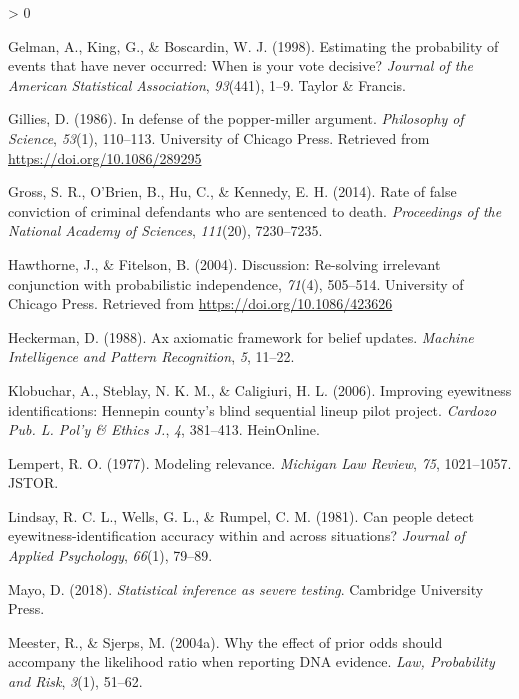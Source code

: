 \documentclass[
  10pt,
  dvipsnames,enabledeprecatedfontcommands]{scrartcl}
\newlength{\cslhangindent}
\newenvironment{CSLReferences}[2] %
 {%
  \setlength{\parindent}{0pt}
  \ifodd #1 \everypar{\setlength{\hangindent}{\cslhangindent}}\ignorespaces\fi
  \ifnum #2 > 0
  \setlength{\parskip}{#2\baselineskip}
  \fi
 }%
 {}
\begin{document}
\begin{CSLReferences}{1}{0}
\leavevmode\hypertarget{ref-gelman1998estimating}{}%
Gelman, A., King, G., \& Boscardin, W. J. (1998). Estimating the
probability of events that have never occurred: When is your vote
decisive? \emph{Journal of the American Statistical Association},
\emph{93}(441), 1--9. Taylor \& Francis.

\leavevmode\hypertarget{ref-Gillies1986defense}{}%
Gillies, D. (1986). In defense of the popper-miller argument.
\emph{Philosophy of Science}, \emph{53}(1), 110--113. University of
Chicago Press. Retrieved from \url{https://doi.org/10.1086/289295}

\leavevmode\hypertarget{ref-gross2014RateFalseConviction}{}%
Gross, S. R., O'Brien, B., Hu, C., \& Kennedy, E. H. (2014). Rate of
false conviction of criminal defendants who are sentenced to death.
\emph{Proceedings of the National Academy of Sciences}, \emph{111}(20),
7230--7235.

\leavevmode\hypertarget{ref-HawthorneFitelson2004re-solving}{}%
Hawthorne, J., \& Fitelson, B. (2004). Discussion: Re-solving irrelevant
conjunction with probabilistic independence, \emph{71}(4), 505--514.
University of Chicago Press. Retrieved from
\url{https://doi.org/10.1086/423626}

\leavevmode\hypertarget{ref-Heckerman1988axiomatic}{}%
Heckerman, D. (1988). Ax axiomatic framework for belief updates.
\emph{Machine Intelligence and Pattern Recognition}, \emph{5}, 11--22.

\leavevmode\hypertarget{ref-klobuchar2006improving}{}%
Klobuchar, A., Steblay, N. K. M., \& Caligiuri, H. L. (2006). Improving
eyewitness identifications: Hennepin county's blind sequential lineup
pilot project. \emph{Cardozo Pub. L. Pol'y \& Ethics J.}, \emph{4},
381--413. HeinOnline.

\leavevmode\hypertarget{ref-lempert1977modeling}{}%
Lempert, R. O. (1977). Modeling relevance. \emph{Michigan Law Review},
\emph{75}, 1021--1057. JSTOR.

\leavevmode\hypertarget{ref-Lindsay1981CanPeopleDetect}{}%
Lindsay, R. C. L., Wells, G. L., \& Rumpel, C. M. (1981). Can people
detect eyewitness-identification accuracy within and across situations?
\emph{Journal of Applied Psychology}, \emph{66}(1), 79--89.

\leavevmode\hypertarget{ref-mayo2018}{}%
Mayo, D. (2018). \emph{Statistical inference as severe testing}.
Cambridge University Press.

\leavevmode\hypertarget{ref-meester2004WhyEffectPriora}{}%
Meester, R., \& Sjerps, M. (2004a). Why the effect of prior odds should
accompany the likelihood ratio when reporting {DNA} evidence. \emph{Law,
Probability and Risk}, \emph{3}(1), 51--62.


\end{CSLReferences}
\end{document}
